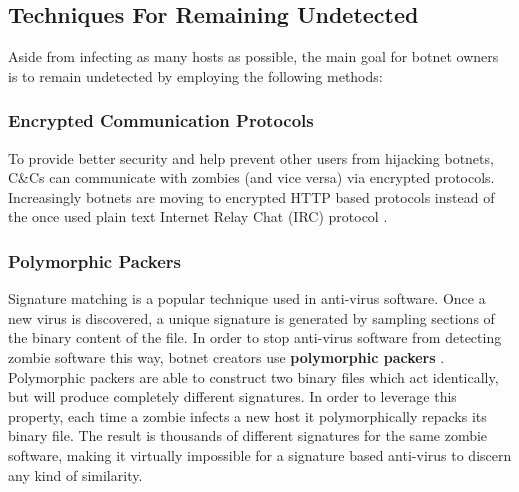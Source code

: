 \subsection{Techniques For Remaining Undetected}
Aside from infecting as many hosts as possible, the main goal for botnet owners
is to remain undetected by employing the following methods:

\subsubsection{Encrypted Communication Protocols}
To provide better security and help prevent other users from hijacking botnets,
C\&Cs can communicate with zombies (and vice versa) via encrypted protocols.
Increasingly botnets are moving to encrypted HTTP based protocols instead of
the once used plain text Internet Relay Chat (IRC) protocol \cite{botlab}.

\subsubsection{Polymorphic Packers}
Signature matching is a popular technique used in anti-virus software.  Once a new
virus is discovered, a unique signature is generated by sampling sections of the
binary content of the file. In order to stop anti-virus software from detecting
zombie software this way, botnet creators use \textbf{polymorphic packers} \cite{botlab}.
Polymorphic packers are able to construct two binary files which act identically, but will
produce completely different signatures. In order to leverage this property, each
time a zombie infects a new host it polymorphically repacks its binary file.  The result
is thousands of different signatures for the same zombie software, making it virtually
impossible for a signature based anti-virus to discern any kind of similarity.

